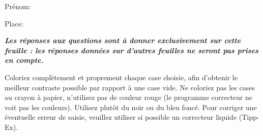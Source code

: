 \documentclass[a4paper]{article}
\begin{document}
{{\begin{minipage}[b]{6.5cm}
{{\begin{minipage}{.9\linewidth}
      \vspace*{.5cm}\dotfill

      Prénom:

      \vspace*{.5cm}\dotfill

      Place:

      \vspace*{.5cm}\dotfill

      \vspace*{1mm}
    \end{minipage}
  }}\hfill\vspace{5ex}

\end{minipage}\hspace*{\fill}

}

\vspace{5ex}

{\bf\em\setlength{\parindent}{0pt} Les réponses aux questions sont à donner exclusivement sur cette feuille :
  les réponses données sur d'autres feuilles ne seront pas prises en compte.

\vspace{1ex}
Coloriez complètement et proprement chaque case choisie, afin d'obtenir le meilleur contraste possible
par rapport à une case vide. Ne coloriez pas les cases au crayon à papier, n'utilisez pas de
couleur rouge (le programme correcteur ne voit pas les couleurs). Utilisez plutôt du noir ou du bleu foncé.
Pour corriger une éventuelle erreur de saisie, veuillez utiliser si possible un correcteur liquide (Tipp-Ex).
}

\vspace{2ex}


\begin{multicols}{2}
\setlength{\parindent}{0pt}
\formulaire
\end{multicols}

\clearpage

}
\end{document}
